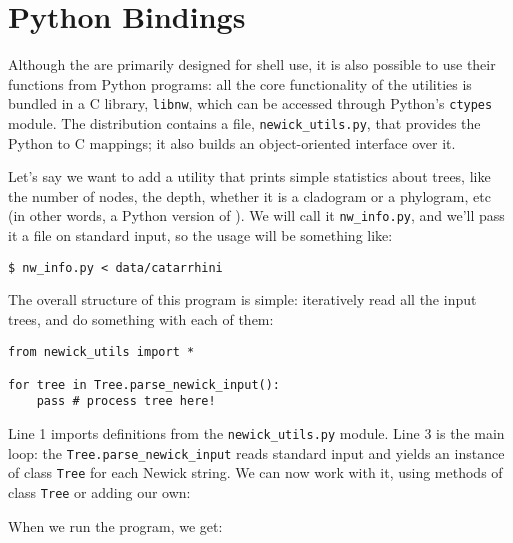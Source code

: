 
\chapter{Python Bindings}
\label{chap_python_lib}

Although the \nutils{} are primarily designed for shell use, it is also possible
to use their functions from Python programs: all the core functionality of the
utilities is bundled in a C library, \texttt{libnw}, which can be accessed
through Python's \texttt{ctypes} module. The distribution contains a file,
\texttt{newick\_utils.py}, that provides the Python to C mappings; it also
builds an object-oriented interface over it.

Let's say we want to add a utility that prints simple statistics about trees,
like the number of nodes, the depth, whether it is a cladogram or a phylogram,
etc (in other words, a Python version of \stats). We will call it
\texttt{nw\_info.py}, and we'll pass it a \nw{} file on standard input, so the
usage will be something like:

\begin{verbatim}
$ nw_info.py < data/catarrhini
\end{verbatim}

\noindent{}The overall structure of this program is simple: iteratively read
all the input trees, and do something with each of them:

\begin{lstlisting}
from newick_utils import *

for tree in Tree.parse_newick_input():
    pass # process tree here!
\end{lstlisting}

\noindent{}Line 1 imports definitions from the \texttt{newick\_utils.py}
module. Line 3 is the main loop: the \texttt{Tree.parse\_newick\_input}
reads standard input and yields an instance of class \texttt{Tree} for each
Newick string. We can now work with it, using methods of class \texttt{Tree} or adding our own:



\noindent{}When we run the program, we get:





